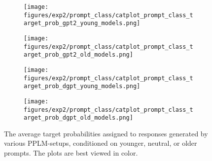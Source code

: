 \begin{figure}[H]
     \centering
     \begin{subfigure}[b]{0.46\textwidth}
        \centering
        \texttt{[image: figures/exp2/prompt\_class/catplot\_prompt\_class\_target\_prob\_gpt2\_young\_models.png]}
        \caption{}
        \label{subfig:catplot_prompt_class_target_prob_gpt2_young}
     \end{subfigure}
     \quad
     \begin{subfigure}[b]{0.46\textwidth}
        \centering
        \texttt{[image: figures/exp2/prompt\_class/catplot\_prompt\_class\_target\_prob\_gpt2\_old\_models.png]}
        \caption{}
        \label{subfig:catplot_prompt_class_target_prob_gpt2_old}
     \end{subfigure}
    \medskip
    \begin{subfigure}[b]{0.46\textwidth}
        \centering
        \texttt{[image: figures/exp2/prompt\_class/catplot\_prompt\_class\_target\_prob\_dgpt\_young\_models.png]}
        \caption{}
        \label{subfig:catplot_prompt_class_target_prob_dgpt_young}
     \end{subfigure}
    \quad
     \begin{subfigure}[b]{0.46\textwidth}
        \centering
        \texttt{[image: figures/exp2/prompt\_class/catplot\_prompt\_class\_target\_prob\_dgpt\_old\_models.png]}
        \caption{}
        \label{subfig:catplot_prompt_class_target_prob_dgpt_old}
     \end{subfigure}
    \caption{The average target probabilities assigned to responses generated by various PPLM-setups, conditioned on younger, neutral, or older prompts. The plots are best viewed in color.}
    \label{fig:catplot_prompt_class_target_prob}
\end{figure}
\vspace{-6mm}
